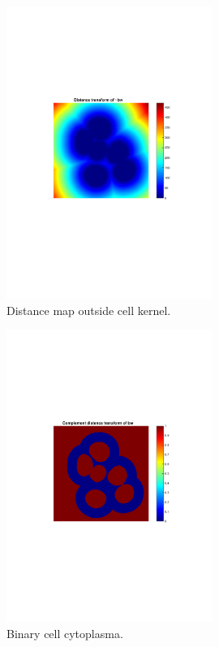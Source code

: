 \documentclass[10pt,twocolumn]{article}
\begin{document}
\begin{figure}[ht]
\centering
\includegraphics[width=0.6\textwidth]{Bilder/CellDist.pdf}
\caption{Distance map outside cell kernel.}
\label{fig:CellDist}
\end{figure}

\begin{figure}[ht]
\centering
\includegraphics[width=0.6\textwidth]{Bilder/CellBwMask.pdf}
\caption{Binary cell cytoplasma.}
\label{fig:CellBWMask}
\end{figure}
\end{document}
